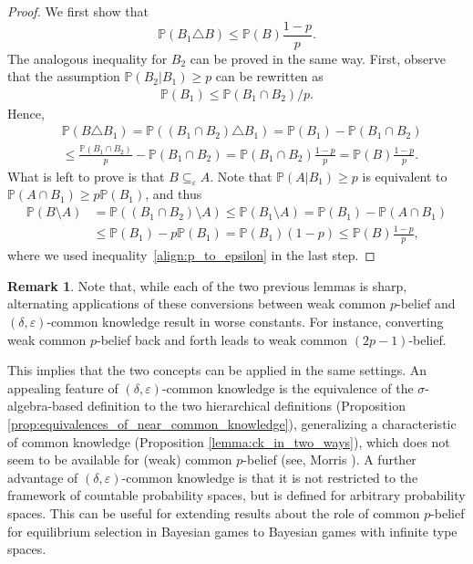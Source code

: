 \documentclass[a4paper, 10pt]{article}
\numberwithin{theorem}{section}
\theoremstyle{definition}
\newtheorem{remark}[theorem]{Remark}
\renewcommand{\epsilon}{\varepsilon}
\renewcommand{\P}{\mathbb{P}}
\begin{document}
\begin{proof}
	We first show that $$\P(B_1 \triangle B) \leq \P(B)  \frac{1-p}{p}.$$
	The analogous inequality for $B_2$ can be proved in the same way.
	First, observe that the assumption $\P(B_2|B_1)\geq p$ can be rewritten as
	\begin{align}\label{align:p_to_epsilon}
	 \P(B_1) \leq \P(B_1 \cap B_2)/p.
	\end{align}
	 Hence,
	\begin{align*}
		&\P(B \triangle B_1) = \P((B_1 \cap B_2) \triangle B_1)  = \P(B_1) - \P(B_1 \cap B_2) \\
		&\leq \frac{\P(B_1 \cap B_2)}{p} - \P(B_1 \cap B_2) = \P(B_1 \cap B_2) \frac{1-p}{p} =\P(B) \frac{1-p}{p}.
	\end{align*}
	What is left to prove is that $B \subseteq_\epsilon A.$ Note that $\P(A|B_1) \geq p$ is equivalent to $\P(A \cap B_1) \geq p \P(B_1)$, and thus
	\begin{align*}
		\P(B \setminus A) &= \P((B_1 \cap B_2) \setminus A) \leq \P(B_1 \setminus A) = \P(B_1)- \P(A\cap B_1)\\
		&\leq \P(B_1) - p\P(B_1) = \P(B_1) (1-p) \leq \P(B) \frac{1-p}{p},
		\end{align*} 
	 where we used inequality~\eqref{align:p_to_epsilon} in the last step.
\end{proof}

\begin{remark}
	Note that, while each of the two previous lemmas is sharp, alternating applications of these conversions between weak common $p$-belief and $(\delta,\epsilon)$-common knowledge result in worse constants. For instance, converting weak common $p$-belief back and forth leads to weak common $(2p-1)$-belief.
\end{remark}




This implies that the two concepts can be applied in the same settings. An appealing feature of $(\delta,\epsilon)$-common knowledge is the equivalence of the $\sigma$-algebra-based definition to the two hierarchical definitions (Proposition  \ref{prop:equivalences_of_near_common_knowledge}), generalizing a characteristic of common knowledge (Proposition \ref{lemma:ck_in_two_ways}), which does not seem to be available for (weak) common $p$-belief (see, Morris \cite{Mo99}). A further advantage of $(\delta,\epsilon)$-common knowledge is that it is not restricted to the framework of countable probability spaces, but is defined for arbitrary probability spaces. This can be useful for extending results about the role of common $p$-belief for equilibrium selection in Bayesian games to Bayesian games with infinite type spaces.
\end{document}
